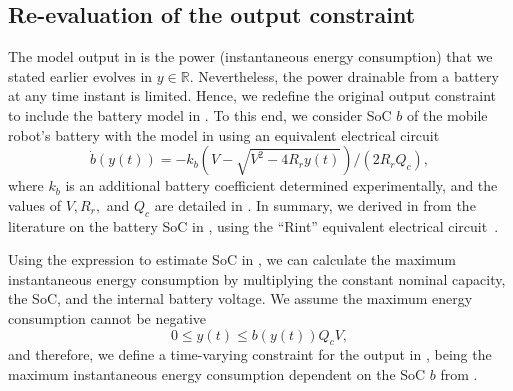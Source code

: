 \subsection{Re-evaluation of the output constraint}
\label{sec:mpc-output-const}

The model output in  is the power (instantaneous energy consumption) that we stated earlier evolves in $y\in\mathbb{R}$. Nevertheless, the power drainable from a battery at any time instant is limited. Hence, we redefine the original output constraint to include the battery model in . To this end, we consider SoC $b$ of the mobile robot's battery with the model in  using an equivalent electrical circuit
\begin{equation}\label{eq:bat}
  \dot{b}(y(t))=-k_b\left(V-
  \sqrt{
    V^2-
    4R_ry(t)}
  \right)/(2R_rQ_c),
\end{equation}
where $k_b$ is an additional battery coefficient determined experimentally, and the values of $V,R_r,$ and $Q_c$ are detailed in .
In summary, we derived  in  from the literature on the battery SoC in , using the ``Rint'' equivalent electrical circuit~\citep{mousavi2014various,hinz2019comparison,he2011evaluation}. 

Using the expression to estimate SoC in , we can calculate the maximum instantaneous energy consumption by multiplying the constant nominal capacity, the SoC, and the internal battery voltage. We assume the maximum energy consumption cannot be negative
\begin{equation}
  0\leq y(t)\leq b(y(t))Q_cV,
\end{equation}
and therefore, we define a time-varying constraint for the output in , being the maximum instantaneous energy consumption dependent on the SoC $b$ from .

